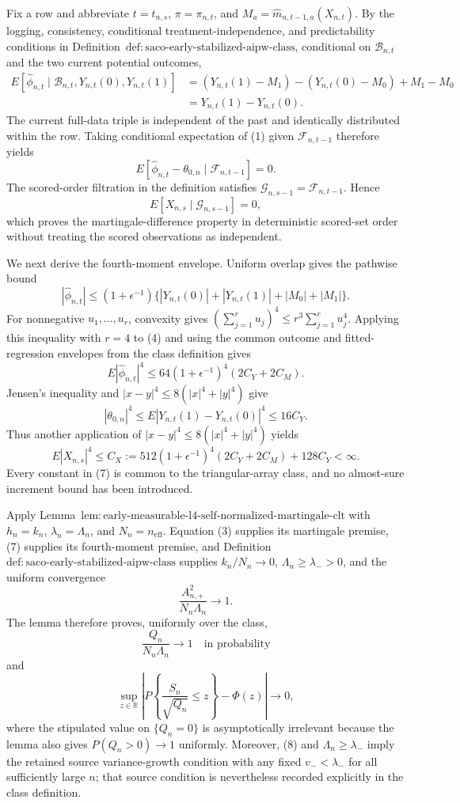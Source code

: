 Fix a row and abbreviate \(t=t_{n,s}\), \(\pi=\pi_{n,t}\), and \(M_a=\widehat m_{n,t-1,a}(X_{n,t})\).  By the logging, consistency, conditional treatment-independence, and predictability conditions in Definition~\(\mathrm{def:saco\text{-}early\text{-}stabilized\text{-}aipw\text{-}class}\), conditional on \(\mathcal B_{n,t}\) and the two current potential outcomes,
\[
\begin{aligned}
E[\widehat\phi_{n,t}\mid\mathcal B_{n,t},Y_{n,t}(0),Y_{n,t}(1)]
&=(Y_{n,t}(1)-M_1)-(Y_{n,t}(0)-M_0)+M_1-M_0\\
&=Y_{n,t}(1)-Y_{n,t}(0).
\end{aligned}
\tag{1}
\]
The current full-data triple is independent of the past and identically distributed within the row.  Taking conditional expectation of (1) given \(\mathcal F_{n,t-1}\) therefore yields
\[
E[\widehat\phi_{n,t}-\theta_{0,n}\mid\mathcal F_{n,t-1}]=0.
\tag{2}
\]
The scored-order filtration in the definition satisfies \(\mathcal G_{n,s-1}=\mathcal F_{n,t-1}\).  Hence
\[
E[X_{n,s}\mid\mathcal G_{n,s-1}]=0,
\tag{3}
\]
which proves the martingale-difference property in deterministic scored-set order without treating the scored observations as independent.

We next derive the fourth-moment envelope.  Uniform overlap gives the pathwise bound
\[
|\widehat\phi_{n,t}|
\le(1+\epsilon^{-1})
\{|Y_{n,t}(0)|+|Y_{n,t}(1)|+|M_0|+|M_1|\}.
\tag{4}
\]
For nonnegative \(u_1,\ldots,u_r\), convexity gives \((\sum_{j=1}^ru_j)^4\le r^3\sum_{j=1}^ru_j^4\).  Applying this inequality with \(r=4\) to (4) and using the common outcome and fitted-regression envelopes from the class definition gives
\[
E|\widehat\phi_{n,t}|^4
\le64(1+\epsilon^{-1})^4(2C_Y+2C_M).
\tag{5}
\]
Jensen's inequality and \(|x-y|^4\le8(|x|^4+|y|^4)\) give
\[
|\theta_{0,n}|^4
\le E|Y_{n,t}(1)-Y_{n,t}(0)|^4
\le16C_Y.
\tag{6}
\]
Thus another application of \(|x-y|^4\le8(|x|^4+|y|^4)\) yields
\[
E|X_{n,s}|^4
\le C_X:=512(1+\epsilon^{-1})^4(2C_Y+2C_M)+128C_Y<\infty.
\tag{7}
\]
Every constant in (7) is common to the triangular-array class, and no almost-sure increment bound has been introduced.

Apply Lemma~\(\mathrm{lem:early\text{-}measurable\text{-}l4\text{-}self\text{-}normalized\text{-}martingale\text{-}clt}\) with \(h_n=k_n\), \(\lambda_n=\Lambda_n\), and \(N_n=n_{\mathrm{eff}}\).  Equation (3) supplies its martingale premise, (7) supplies its fourth-moment premise, and Definition~\(\mathrm{def:saco\text{-}early\text{-}stabilized\text{-}aipw\text{-}class}\) supplies \(k_n/N_n\to0\), \(\Lambda_n\ge\lambda_->0\), and the uniform convergence
\[
\frac{A_{n,+}^2}{N_n\Lambda_n}\longrightarrow1.
\tag{8}
\]
The lemma therefore proves, uniformly over the class,
\[
\frac{Q_n}{N_n\Lambda_n}\longrightarrow1
\quad\text{in probability}
\tag{9}
\]
and
\[
\sup_{z\in\mathbb R}
\left|P\left\{\frac{S_n}{\sqrt{Q_n}}\le z\right\}-\Phi(z)\right|
\longrightarrow0,
\tag{10}
\]
where the stipulated value on \(\{Q_n=0\}\) is asymptotically irrelevant because the lemma also gives \(P(Q_n>0)\to1\) uniformly.  Moreover, (8) and \(\Lambda_n\ge\lambda_-\) imply the retained source variance-growth condition with any fixed \(v_-<\lambda_-\) for all sufficiently large \(n\); that source condition is nevertheless recorded explicitly in the class definition.

